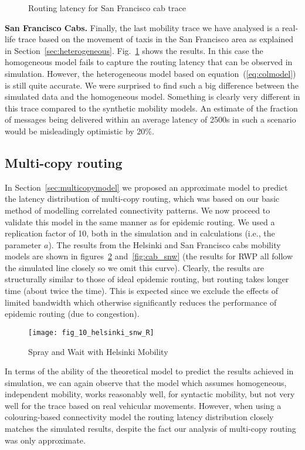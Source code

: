 \documentclass{article}
\begin{document}
\begin{figure}[htb]
  \centering
   \caption{Routing latency for San Francisco cab trace}
  \label{fig:cab}
\end{figure}


{\bf San Francisco Cabs.}
\label{sec:cab}
Finally, the last mobility trace we have analysed is a real-life trace
based on the movement of taxis in the San Francisco area as explained
in Section~\ref{sec:heterogeneous}. Fig.~\ref{fig:cab} shows the
results. In this case the homogeneous model fails to capture the
routing latency that can be observed in simulation. However, the
heterogeneous model based on equation~(\ref{eq:colmodel}) is still quite
accurate. We were surprised to find such a big difference between the
simulated data and the homogeneous model. Something is clearly very
different in this trace compared to the synthetic mobility models. An
estimate of the fraction of messages being delivered within an average
latency of 2500s in such a scenario would be misleadingly optimistic
by 20\%.

\subsection{Multi-copy routing}

In Section~\ref{sec:multicopymodel} we proposed an approximate model
to predict the latency distribution of multi-copy routing, which was
based on our basic method of modelling correlated connectivity
patterns.  We now proceed to validate this model in the same manner as
for epidemic routing. We used a replication factor of 10, both in the
simulation and in calculations (i.e., the parameter $a$).  The results
from the Helsinki and San Francisco cabs mobility models are shown in
figures~\ref{fig:helsinki_snw} and~\ref{fig:cab_snw} (the results for
RWP all follow the simulated line closely so we omit this
curve). Clearly, the results are structurally similar to those of
ideal epidemic routing, but routing takes longer time (about twice the
time). This is expected since we exclude the effects of limited
bandwidth which otherwise significantly reduces the performance of
epidemic routing (due to congestion).

\begin{figure}[ht]
  \centering
  \texttt{[image: fig\_10\_helsinki\_snw\_R]}
  \caption{Spray and Wait with Helsinki Mobility}
  \label{fig:helsinki_snw}
\end{figure}
In terms of the ability of the theoretical model to predict the
results achieved in simulation, we can again observe that the model
which assumes homogeneous, independent mobility, works reasonably
well, for syntactic mobility, but not very well for the trace based on
real vehicular movements. However, when using a colouring-based
connectivity model the routing latency distribution closely matches
the simulated results, despite the fact our analysis of multi-copy
routing was only approximate.
\end{document}
